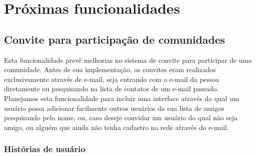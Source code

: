 
\section{Próximas funcionalidades}

\subsection{Convite para participação de comunidades}

Esta funcionalidade prevê melhorias no sistema de convite para participar de
uma comunidade. Antes de sua implementação, os convites eram realizados
exclusivamente através de e-mail, seja entrando com o e-mail da pessoa
diretamente ou pesquisando na lista de contatos de um e-mail passado. Planejamos
esta funcionalidade para incluir uma interface através da qual um usuário
possa adicionar facilmente outros usuários da sua lista de amigos pesquisando
pelo nome, ou, caso deseje convidar um usuário do qual não seja amigo, ou alguém
que ainda não tenha cadastro na rede através do e-mail.

\subsubsection*{Histórias de usuário}

